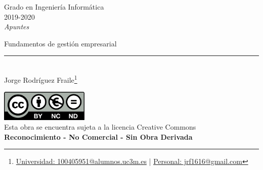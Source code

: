 \documentclass[12pt, twoside, openright]{report} %
\begin{document}
	
\begin{titlepage}
	\begin{sffamily}
	\color{azulUC3M}
	\begin{center}
		\begin{figure}[H] %
		\end{figure}
		\vspace{2.5cm}
		\begin{Large}
			Grado en Ingeniería Informática\\			
			2019-2020\\
			\vspace{2cm}		
			\textsl{Apuntes}\\
			\bigskip
		\end{Large}
		 	{\Huge Fundamentos de gestión empresarial}\\
		 	\vspace*{0.5cm}
	 		\rule{10.5cm}{0.1mm}\\
			\vspace*{0.9cm}
			{\LARGE Jorge Rodríguez Fraile\footnote{\href{mailto:100405951@alumnos.uc3m.es}{Universidad: 100405951@alumnos.uc3m.es}  |  \href{mailto:jrf1616@gmail.com}{Personal: jrf1616@gmail.com}}}\\ 
			\vspace*{1cm}
	\end{center}
	\vfill
	\color{black}
		\includegraphics[width=4.2cm]{img/creativecommons.png}\\
		Esta obra se encuentra sujeta a la licencia Creative Commons\\ \textbf{Reconocimiento - No Comercial - Sin Obra Derivada}
	\end{sffamily}
\end{titlepage}


\tableofcontents
\thispagestyle{fancy}
\end{document}
